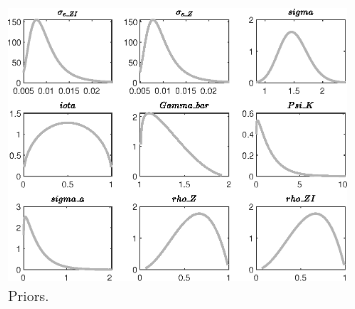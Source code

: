  
\begin{figure}[H]
\centering
\includegraphics[width=0.80\textwidth]{two_sector_RBC_differentiated_est/graphs/two_sector_RBC_differentiated_est_Priors1}
\caption{Priors.}\label{Fig:Priors:1}
\end{figure}
 
